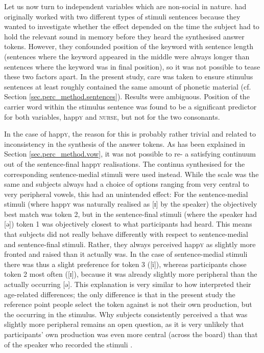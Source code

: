 Let us now turn to independent variables which are non-social in nature.
\textcite{hayetal2006a} had originally worked with two different types of stimuli sentences because they wanted to investigate whether the  effect depended on the time the subject had to hold the relevant sound in memory before they heard the synthesised answer tokens.
However, they confounded position of the keyword with sentence length (sentences where the keyword appeared in the middle were always longer than sentences where the keyword was in final position), so it was not possible to tease these two factors apart.
In the present study, care was taken to ensure stimulus sentences at least roughly contained the same amount of phonetic material (cf. Section \ref{sec.perc_method.sentences}).
Results were ambiguous.
Position of the carrier word within the stimulus sentence was found to be a significant predictor for both  variables, happ\textsc{y} and \textsc{nurse}, but not for the two consonants.

In the case of happ\textsc{y}, the reason for this is probably rather trivial and related to inconsistency in the synthesis of the answer tokens.
As has been explained in Section \ref{sec.perc_method.vow}, it was not possible to re- a satisfying  continuum out of the sentence-final happ\textsc{y} realisations.
The continua synthesised for the corresponding sentence-medial stimuli were used instead.
While the scale was the same and subjects always had a choice of options ranging from very central to very peripheral vowels, this had an unintended effect: For the sentence-medial stimuli (where happ\textsc{y} was naturally realised as [ɪ] by the speaker) the objectively best match was token 2, but in the sentence-final stimuli (where the speaker had [ə]) token 1 was objectively closest to what participants had heard.
This means that subjects did not really behave differently with respect to sentence-medial and sentence-final stimuli.
Rather, they always perceived happ\textsc{y} as slightly more fronted and raised than it actually was.
In the case of sentence-medial stimuli there was thus a slight preference for token 3 ([ï]), whereas participants chose token 2 most often ([ɪ]), because it was already slightly more peripheral than the actually occurring [ə].
This explanation is very similar to how \textcite[878--879; see also above]{haydrager2010} interpreted their age-related differences; the only difference is that in the present study the reference point people select the token against is not their own production, but the  occurring in the stimulus.
Why subjects consistently perceived a  that was slightly more peripheral remains an open question, as it is very unlikely that participants' own production was even more central (across the board) than that of the  speaker who recorded the stimuli \parencite[cf.][878--879]{haydrager2010}.

